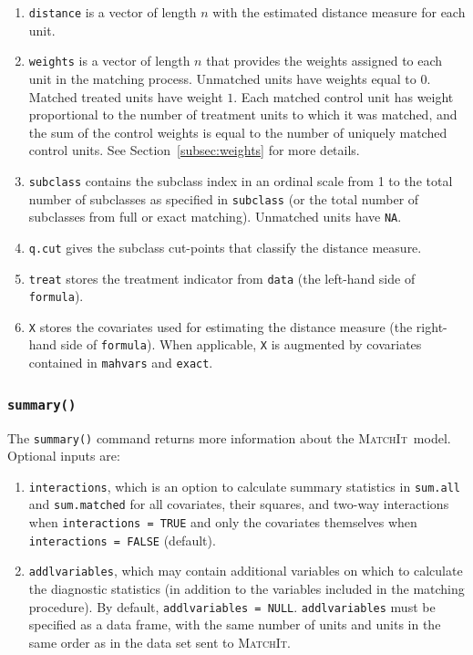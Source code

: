 \documentclass[oneside,letterpaper,titlepage]{article}
\newcommand{\MatchIt}{\textsc{MatchIt}}
\begin{document}
\begin{enumerate}
\item \texttt{distance} is a vector of length $n$ with the estimated
  distance measure for each unit.
  
\item \texttt{weights} is a vector of length $n$ that provides the
  weights assigned to each unit in the matching process.  Unmatched
  units have weights equal to $0$. Matched treated units have weight
  $1$.  Each matched control unit has weight proportional to the
  number of treatment units to which it was matched, and the sum of
  the control weights is equal to the number of uniquely matched
  control units. See Section~\ref{subsec:weights} for more details.
  
\item \texttt{subclass} contains the subclass index in an ordinal
  scale from 1 to the total number of subclasses as specified in
  \texttt{subclass} (or the total number of subclasses from full or
  exact matching).  Unmatched units have \texttt{NA}.
  
\item \texttt{q.cut} gives the subclass cut-points that classify the
  distance measure.
  
\item \texttt{treat} stores the treatment indicator from \texttt{data}
  (the left-hand side of \texttt{formula}).
 
\item \texttt{X} stores the covariates used for estimating the
  distance measure (the right-hand side of \texttt{formula}).  When
  applicable, \texttt{X} is augmented by covariates contained in
  \texttt{mahvars} and \texttt{exact}. 
\end{enumerate}


\subsubsection{{\tt summary()}}
The \texttt{summary()} command returns more information about the
\MatchIt\ model.  Optional inputs are:

\begin{enumerate}
\item \texttt{interactions}, which is an option to calculate summary
  statistics in \texttt{sum.all} and \texttt{sum.matched} for all
  covariates, their squares, and two-way interactions when
  \texttt{interactions = TRUE} and only the covariates themselves when
  \texttt{interactions = FALSE} (default).
\item \texttt{addlvariables}, which may contain additional variables
  on which to calculate the diagnostic statistics (in addition to the
  variables included in the matching procedure).  By default,
  \texttt{addlvariables = NULL}.  \texttt{addlvariables} must be
  specified as a data frame, with the same number of units and units
  in the same order as in the data set sent to \MatchIt .
\end{enumerate}
\end{document}
